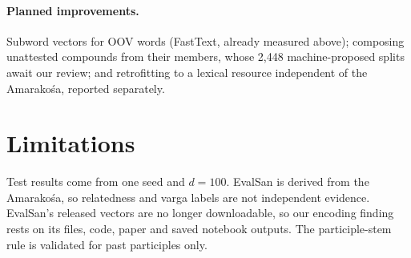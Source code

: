 \documentclass[11pt]{article}
\begin{document}
\paragraph{Planned improvements.} Subword vectors for OOV words (FastText,
already measured above); composing unattested compounds from their members,
whose 2,448 machine-proposed splits await our review; and retrofitting to a
lexical resource independent of the Amarakośa, reported separately.

\section*{Limitations}
Test results come from one seed and $d=100$. EvalSan is derived from the
Amarakośa, so relatedness and varga labels are not independent evidence.
EvalSan's released vectors are no longer downloadable, so our encoding
finding rests on its files, code, paper and saved notebook outputs. The
participle-stem rule is validated for past participles only.


\end{document}
